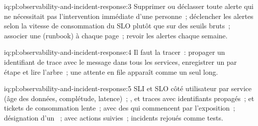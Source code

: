 \begin{solution}{iq:pl:observability-and-incident-response:3}
Supprimer ou déclasser toute alerte qui ne nécessitait pas l'intervention immédiate d'une personne~; déclencher les alertes selon la vitesse de consommation du SLO plutôt que sur des seuils bruts~; associer une  (runbook) à chaque page~;
revoir les alertes chaque semaine.
\end{solution}

\begin{solution}{iq:pl:observability-and-incident-response:4}
Il faut la tracer~: propager un identifiant de trace avec le message dans tous les services, enregistrer un  par étape et lire l'arbre~; une attente en file
apparaît comme un seul  long.
\end{solution}

\begin{solution}{iq:pl:observability-and-incident-response:5}
SLI et SLO côté utilisateur par service (âge des données, complétude, latence)~; ,  et traces avec identifiants propagés~;
 et tickets de consommation lente~;  avec des  qui commencent par l'exposition~; désignation d'un ~;  avec
actions suivies~; incidents rejoués comme tests.
\end{solution}
